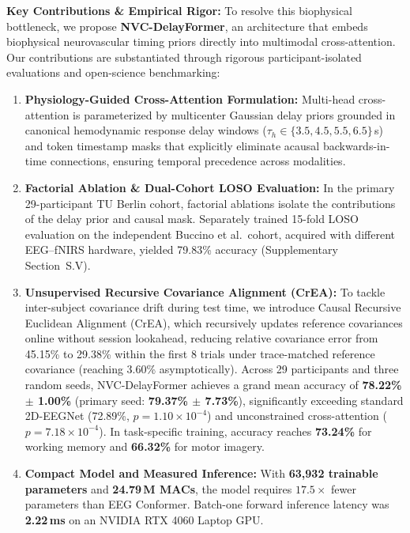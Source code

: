 \documentclass[10pt,a4paper]{article}
\begin{document}
\smallskip
\noindent\textbf{Key Contributions \& Empirical Rigor:}
To resolve this biophysical bottleneck, we propose \textbf{NVC-DelayFormer}, an architecture that embeds biophysical neurovascular timing priors directly into multimodal cross-attention. Our contributions are substantiated through rigorous participant-isolated evaluations and open-science benchmarking:
\begin{enumerate}
  \item \textbf{Physiology-Guided Cross-Attention Formulation:} Multi-head cross-attention is parameterized by multicenter Gaussian delay priors grounded in canonical hemodynamic response delay windows ($\tau_h \in \{3.5, 4.5, 5.5, 6.5\}$\,s) and token timestamp masks that explicitly eliminate acausal backwards-in-time connections, ensuring temporal precedence across modalities.
  \item \textbf{Factorial Ablation \& Dual-Cohort LOSO Evaluation:} In the primary 29-participant TU Berlin cohort, factorial ablations isolate the contributions of the delay prior and causal mask. Separately trained 15-fold LOSO evaluation on the independent Buccino et al.\ cohort, acquired with different EEG--fNIRS hardware, yielded 79.83\% accuracy (Supplementary Section~S.V).
  \item \textbf{Unsupervised Recursive Covariance Alignment (CrEA):} To tackle inter-subject covariance drift during test time, we introduce Causal Recursive Euclidean Alignment (CrEA), which recursively updates reference covariances online without session lookahead, reducing relative covariance error from 45.15\% to 29.38\% within the first 8 trials under trace-matched reference covariance (reaching 3.60\% asymptotically). Across 29 participants and three random seeds, NVC-DelayFormer achieves a grand mean accuracy of \textbf{78.22\% $\pm$ 1.00\%} (primary seed: \textbf{79.37\% $\pm$ 7.73\%}), significantly exceeding standard 2D-EEGNet (72.89\%, $p = 1.10\times 10^{-4}$) and unconstrained cross-attention ($p = 7.18\times 10^{-4}$). In task-specific training, accuracy reaches \textbf{73.24\%} for working memory and \textbf{66.32\%} for motor imagery.
  \item \textbf{Compact Model and Measured Inference:} With \textbf{63,932 trainable parameters} and \textbf{24.79\,M MACs}, the model requires $17.5\times$ fewer parameters than EEG Conformer. Batch-one forward inference latency was \textbf{2.22\,ms} on an NVIDIA RTX 4060 Laptop GPU.
\end{enumerate}
\end{document}
